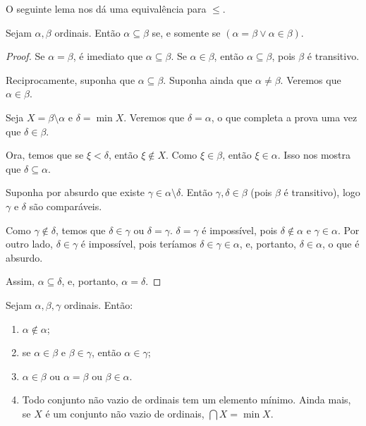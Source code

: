 O seguinte lema nos dá uma equivalência para $\leq$.
\begin{lemma}[$\BST$]\label{lem:inclusaoDeOrdinaisEquivPertencimentoOuIgualdade}
    Sejam $\alpha, \beta$ ordinais.
    Então $\alpha\subseteq \beta$ se, e somente se $(\alpha=\beta \lor \alpha\in \beta)$.
\end{lemma}
\begin{proof}
    Se $\alpha=\beta$, é imediato que $\alpha\subseteq \beta$.
    Se $\alpha\in \beta$, então $\alpha\subseteq \beta$, pois $\beta$ é transitivo.

    Reciprocamente, suponha que $\alpha\subseteq \beta$.
    Suponha ainda que $\alpha\neq \beta$.
    Veremos que $\alpha\in \beta$.

    Seja $X=\beta\setminus \alpha$ e $\delta=\min X$.
    Veremos que $\delta=\alpha$, o que completa a prova uma vez que $\delta\in \beta$.

    Ora, temos que se $\xi<\delta$, então $\xi\notin X$.
    Como $\xi\in \beta$, então $\xi\in \alpha$.
    Isso nos mostra que $\delta\subseteq \alpha$.

    Suponha por absurdo que existe $\gamma \in \alpha\setminus \delta$.
    Então $\gamma, \delta \in \beta$ (pois $\beta$ é transitivo), logo $\gamma$ e $\delta$ são comparáveis.
    
    Como $\gamma\notin \delta$, temos que $\delta\in \gamma$ ou $\delta=\gamma$.
    $\delta=\gamma$ é impossível, pois $\delta\notin \alpha$ e $\gamma\in \alpha$.
    Por outro lado, $\delta \in \gamma$ é impossível, pois teríamos $\delta\in \gamma \in \alpha$, e, portanto, $\delta\in \alpha$, o que é absurdo.

    Assim, $\alpha\subseteq \delta$, e, portanto, $\alpha=\delta$.
\end{proof}
\begin{proposition}[$\BST$]\label{prop:estruturaBasicaDosOrdinais}
    Sejam $\alpha, \beta, \gamma$ ordinais.
    Então:

    \begin{enumerate}[label=(\alph*)]
        \item $\alpha\notin \alpha$;
        \item se $\alpha\in \beta$ e $\beta\in \gamma$, então $\alpha\in \gamma$;
        \item $\alpha\in \beta$ ou $\alpha=\beta$ ou $\beta\in \alpha$.
        \item Todo conjunto não vazio de ordinais tem um elemento mínimo.
        Ainda mais, se $X$ é um conjunto não vazio de ordinais, $\bigcap X=\min X$.
    \end{enumerate}        
\end{proposition}
